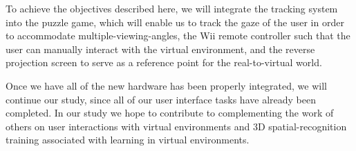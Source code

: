 \documentclass[]{spie}  %
\begin{document}
To achieve the objectives described here, we will integrate the tracking system into the puzzle game, which will enable us to track the gaze of the user in order to accommodate multiple-viewing-angles, the Wii remote controller such that the user can manually interact with the virtual environment, and the reverse projection screen to serve as a reference point for the real-to-virtual world.

Once we have all of the new hardware has been properly integrated, we will continue our study, since all of our user interface tasks have already been completed. In our study we hope to contribute to complementing the work of others on user interactions with virtual environments and 3D spatial-recognition training associated with learning in virtual environments. 


%
\end{document}
